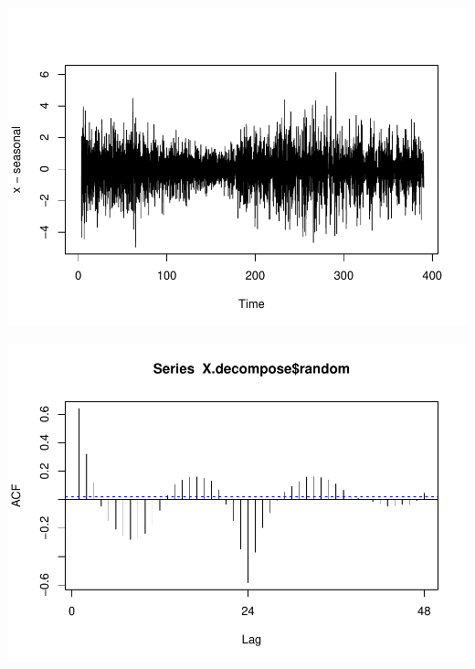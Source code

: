 \documentclass[
]{article}
\newenvironment{Shaded}{\begin{snugshade}}{\end{snugshade}}
\newcommand{\FunctionTok}[1]{\textcolor[rgb]{0.00,0.00,0.00}{#1}}
\newcommand{\NormalTok}[1]{#1}
\newcommand{\SpecialCharTok}[1]{\textcolor[rgb]{0.00,0.00,0.00}{#1}}
\begin{document}
\begin{Shaded}
\end{Shaded}

\includegraphics{STA202_report_files/figure-latex/unnamed-chunk-12-14.pdf}

\begin{Shaded}
\end{Shaded}

\includegraphics{STA202_report_files/figure-latex/unnamed-chunk-12-15.pdf}
\end{document}
